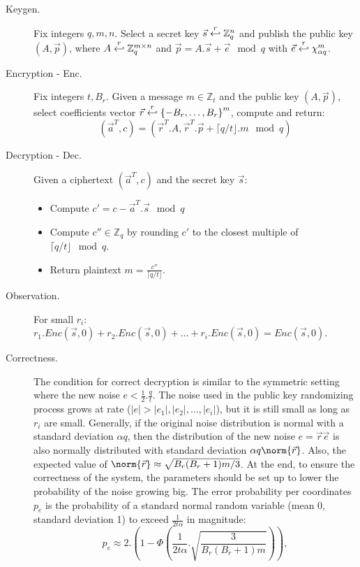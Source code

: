 \begin{description}
\item [Keygen.] Fix integers $q, m, n$. Select a secret key
  $\vec{s} \stackrel{r}{\hookleftarrow} \mathbb{Z}_q^n$ and publish the public key
  $(A,\vec{p})$, where $A \stackrel{r}{\hookleftarrow} \mathbb{Z}_q^{m \times n}$ and
  $\vec{p} = A.\vec{s} + \vec{e} \mod q$ with
  $\vec{e} \stackrel{r}{\hookleftarrow} \chi_{\alpha q}^m$.
\item [Encryption - Enc.] Fix integers $t, B_r$. Given a message
  $m \in \mathbb{Z}_t$ and the public key $(A,\vec{p})$, select coefficients
  vector $\vec{r} \stackrel{r}{\hookleftarrow} \left\{ -B_r, \dots, B_r \right\}^m$, compute
  and return:
  \[
    (\vec{a}^T, c) = ( \vec{r}^T . A, \vec{r}^T .  \vec{p} + \lceil q/t \rfloor
    . m \mod q)
  \]
\item [Decryption - Dec.] Given a ciphertext $(\vec{a}^T, c)$ and the secret key
  $\vec{s}$:
  \begin{itemize}
  \item Compute $c' = c - \vec{a}^T . \vec{s} \mod q$
  \item Compute $c'' \in \mathbb{Z}_q$ by rounding $c'$ to the closest multiple
    of $\lceil q/t \rfloor \mod q$.
  \item Return plaintext $m = \frac{c''}{\lceil q/t \rfloor}$.
  \end{itemize}
\item [Observation.] For small $r_i$:
  $r_1.Enc(\vec{s},0) + r_2.Enc(\vec{s}, 0) + \dots + r_i.Enc(\vec{s},0) =
  Enc(\vec{s}, 0)$.
\item [Correctness.] The condition for correct decryption is similar to the
  symmetric setting where the new noise $e < \frac{1}{2}. \frac{q}{t}$. The
  noise used in the public key randomizing process grows at rate
  ($|e| > |e_1|, |e_2|,\dots,|e_i|$), but it is still small as long as $r_i$ are
  small. Generally, if the original noise distribution is normal with a standard
  deviation $\alpha q$, then the distribution of the new noise
  $e = \vec{r}\vec{e}$ is also normally distributed with standard deviation
  $\alpha q \norm{\vec{r}}$. Also, the expected value of
  $\norm{\vec{r}} \approx \sqrt{B_r(B_r + 1)m/3}$. At the end, to ensure the
  correctness of the system, the parameters should be set up to lower the
  probability of the noise growing big. The error probability per
  coordinates $p_e$ is the probability of a standard normal random variable
  (mean 0, standard deviation 1) to exceed $\frac{1}{2t\alpha}$ in magnitude:
  \[
    p_e \approx 2 . \left( 1 - \Phi\left(
        \frac{1}{2t\alpha}.\sqrt{\frac{3}{B_r(B_r+1)m}} \right) \right),
\]
\end{description}
